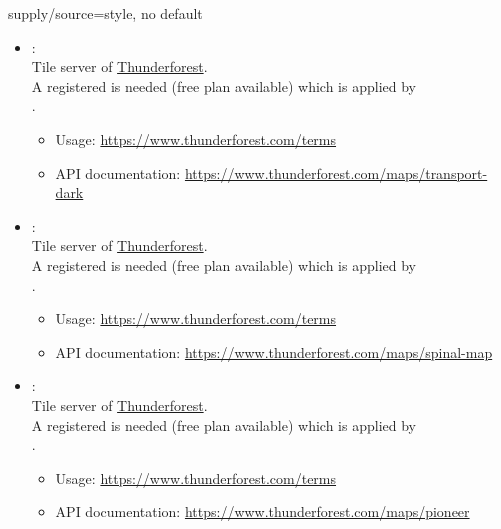 \begin{docMrcKey}{supply/source}{=}{style, no default}
\begin{itemize}
  \item{}:\\
    Tile server of \href{https://www.thunderforest.com}{Thunderforest}.\\
    A registered  is needed (free plan available)
    which is applied by\\
    .
    \begin{itemize}
    \item Usage: \url{https://www.thunderforest.com/terms}
    \item API documentation: \url{https://www.thunderforest.com/maps/transport-dark}
    \end{itemize}

  \item{}:\\
    Tile server of \href{https://www.thunderforest.com}{Thunderforest}.\\
    A registered  is needed (free plan available)
    which is applied by\\
    .
    \begin{itemize}
    \item Usage: \url{https://www.thunderforest.com/terms}
    \item API documentation: \url{https://www.thunderforest.com/maps/spinal-map}
    \end{itemize}

\clearpage
  \item{}:\\
    Tile server of \href{https://www.thunderforest.com}{Thunderforest}.\\
    A registered  is needed (free plan available)
    which is applied by\\
    .
    \begin{itemize}
    \item Usage: \url{https://www.thunderforest.com/terms}
    \item API documentation: \url{https://www.thunderforest.com/maps/pioneer}
    \end{itemize}


\end{itemize}
\end{docMrcKey}
